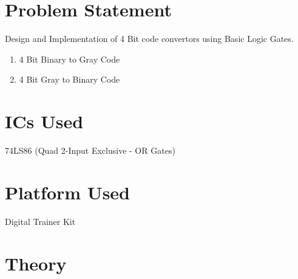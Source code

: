 \documentclass[11pt]{article}
\begin{document}
	
\tableofcontents
\thispagestyle{empty}
\clearpage


\setcounter{page}{1}

\section{Problem Statement}
Design and Implementation of 4 Bit code convertors using Basic Logic Gates. 
\begin{enumerate}
	\item 4 Bit Binary to Gray Code
	\item 4 Bit Gray to Binary Code
\end{enumerate}

\section{ICs Used}
74LS86 (Quad 2-Input Exclusive - OR Gates)

\section{Platform Used}
Digital Trainer Kit

\section{Theory}
\end{document}
